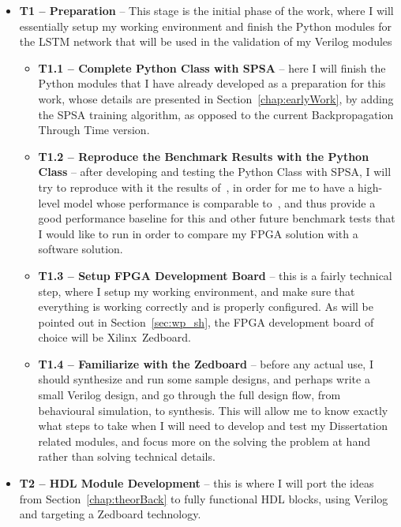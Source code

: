 \begin{itemize}
    \item \textbf{T1 -- Preparation} -- This stage is the initial phase of the work, where I will essentially setup my working environment and finish the Python modules for the LSTM network that will be used in the validation of my Verilog modules

        \begin{itemize}
            \item \textbf{T1.1 -- Complete Python Class with SPSA} -- here I will finish the Python modules that I have already developed as a preparation for this work, whose details are presented in Section~\ref{chap:earlyWork}, by adding the SPSA training algorithm, as opposed to the current Backpropagation Through Time version.

            \item \textbf{T1.2 -- Reproduce the Benchmark Results with the Python Class} -- after developing and testing the Python Class with SPSA, I will try to reproduce with it the results of~\cite{Tavear13}, in order for me to have a high-level model whose performance is comparable to~\cite{Tavear13, Hochreiter07}, and thus provide a good performance baseline for this and other future benchmark tests that I would like to run in order to compare my FPGA solution with a software solution.

            \item \textbf{T1.3 -- Setup FPGA Development Board} -- this is a fairly technical step, where I setup my working environment, and make sure that everything is working correctly and is properly configured. As will be pointed out in Section~\ref{sec:wp_sh}, the FPGA development board of choice will be Xilinx~\textregistered Zedboard.

            \item \textbf{T1.4 -- Familiarize with the Zedboard} -- before any actual use, I should synthesize and run some sample designs, and perhaps write a small Verilog design, and go through the full design flow, from behavioural simulation, to synthesis. This will allow me to know exactly what steps to take when I will need to develop and test my Dissertation related modules, and focus more on the solving the problem at hand rather than solving technical details.
        \end{itemize}

    \item \textbf{T2 -- HDL Module Development} -- this is where I will port the ideas from Section~\ref{chap:theorBack} to fully functional HDL blocks, using Verilog and targeting a Zedboard technology.


\end{itemize}
